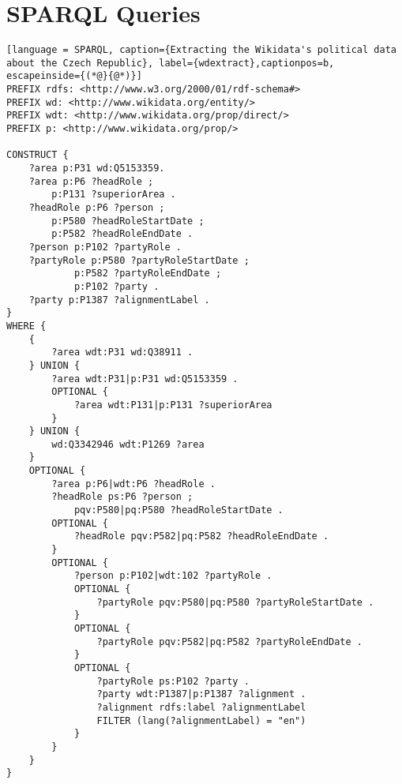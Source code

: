 \chapter{SPARQL Queries}

\begin{lstlisting}[language = SPARQL, caption={Extracting the Wikidata's political data about the Czech Republic}, label={wdextract},captionpos=b, escapeinside={(*@}{@*)}]
PREFIX rdfs: <http://www.w3.org/2000/01/rdf-schema#>
PREFIX wd: <http://www.wikidata.org/entity/>
PREFIX wdt: <http://www.wikidata.org/prop/direct/>
PREFIX p: <http://www.wikidata.org/prop/>

CONSTRUCT {
    ?area p:P31 wd:Q5153359.
    ?area p:P6 ?headRole ; 
        p:P131 ?superiorArea .
    ?headRole p:P6 ?person ;
        p:P580 ?headRoleStartDate ;
        p:P582 ?headRoleEndDate .
    ?person p:P102 ?partyRole .
    ?partyRole p:P580 ?partyRoleStartDate ;
            p:P582 ?partyRoleEndDate ;
            p:P102 ?party .
    ?party p:P1387 ?alignmentLabel .
}
WHERE {
    {
        ?area wdt:P31 wd:Q38911 .
    } UNION {
        ?area wdt:P31|p:P31 wd:Q5153359 .
        OPTIONAL {
            ?area wdt:P131|p:P131 ?superiorArea
        }
    } UNION {
        wd:Q3342946 wdt:P1269 ?area
    }
    OPTIONAL {
        ?area p:P6|wdt:P6 ?headRole .
        ?headRole ps:P6 ?person ;
            pqv:P580|pq:P580 ?headRoleStartDate .
        OPTIONAL {
            ?headRole pqv:P582|pq:P582 ?headRoleEndDate .
        }
        OPTIONAL {
            ?person p:P102|wdt:102 ?partyRole .
            OPTIONAL {
                ?partyRole pqv:P580|pq:P580 ?partyRoleStartDate .
            }
            OPTIONAL {
                ?partyRole pqv:P582|pq:P582 ?partyRoleEndDate .
            }
            OPTIONAL {
                ?partyRole ps:P102 ?party .
                ?party wdt:P1387|p:P1387 ?alignment .
                ?alignment rdfs:label ?alignmentLabel
                FILTER (lang(?alignmentLabel) = "en")
            }
        }
    }
}
\end{lstlisting}


